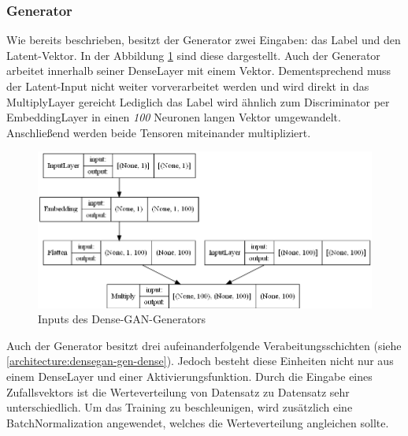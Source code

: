\subsubsection{Generator}
Wie bereits beschrieben, besitzt der Generator zwei Eingaben: das Label und den Latent-Vektor.
In der Abbildung \ref{architecture:densegan-gen-input} sind diese dargestellt.
Auch der Generator arbeitet innerhalb seiner DenseLayer mit einem Vektor.
Dementsprechend muss der Latent-Input nicht weiter vorverarbeitet werden und wird direkt in das MultiplyLayer gereicht
Lediglich das Label wird ähnlich zum Discriminator per EmbeddingLayer in einen \textit{100} Neuronen langen Vektor umgewandelt.
Anschließend werden beide Tensoren miteinander multipliziert.

\begin{figure}[H]
	\centering
	\includegraphics[height=0.3\textheight]{kapitel/5_ergebnisse/architectures/densegan_generator/input.png}
	\caption{Inputs des Dense-GAN-Generators}
	\label{architecture:densegan-gen-input}
\end{figure}

Auch der Generator besitzt drei aufeinanderfolgende Verabeitungsschichten (siehe \ref{architecture:densegan-gen-dense}).
Jedoch besteht diese Einheiten nicht nur aus einem DenseLayer und einer Aktivierungsfunktion.
Durch die Eingabe eines Zufallsvektors ist die Werteverteilung von Datensatz zu Datensatz sehr unterschiedlich.
Um das Training zu beschleunigen, wird zusätzlich eine BatchNormalization angewendet, welches die Werteverteilung angleichen sollte.

